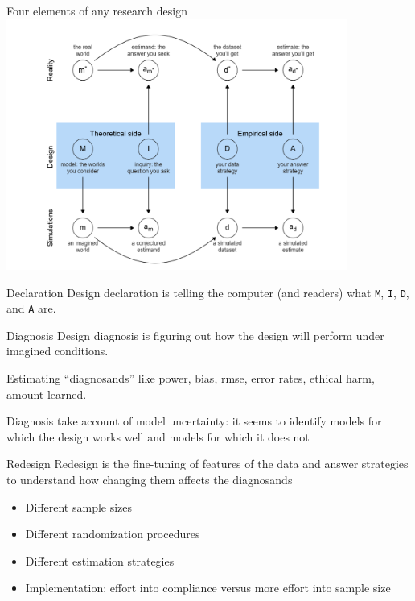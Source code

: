 \documentclass[
  11pt,
  ignorenonframetext,
]{beamer}
\providecommand{\tightlist}{%
  \setlength{\itemsep}{0pt}\setlength{\parskip}{0pt}}\usepackage{longtable,booktabs,array}
\begin{document}
\begin{frame}{Four elements of any research design}
\protect\hypertarget{four-elements-of-any-research-design-1}{}
\includegraphics[width=4.41in,height=\textheight]{assets/mida.png}
\end{frame}

\begin{frame}[fragile]{Declaration}
\protect\hypertarget{declaration}{}
Design declaration is telling the computer (and readers) what
\texttt{M}, \texttt{I}, \texttt{D}, and \texttt{A} are.
\end{frame}

\begin{frame}{Diagnosis}
\protect\hypertarget{diagnosis}{}
Design diagnosis is figuring out how the design will perform under
imagined conditions.

Estimating ``diagnosands'' like power, bias, rmse, error rates, ethical
harm, amount learned.

Diagnosis take account of model uncertainty: it seems to identify models
for which the design works well and models for which it does not
\end{frame}

\begin{frame}{Redesign}
\protect\hypertarget{redesign}{}
Redesign is the fine-tuning of features of the data and answer
strategies to understand how changing them affects the diagnosands

\begin{itemize}
\tightlist
\item
  Different sample sizes
\item
  Different randomization procedures
\item
  Different estimation strategies
\item
  Implementation: effort into compliance versus more effort into sample
  size
\end{itemize}
\end{frame}
\end{document}
